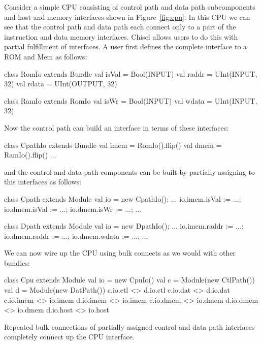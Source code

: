 \documentclass[twocolumn,10pt]{article}
\begin{document}
Consider a simple CPU consisting of control path and data path subcomponents and host and memory interfaces shown in Figure~\ref{fig:cpu}.
In this CPU we can see that the control path and data path each connect only to a part of the instruction and data memory interfaces. 
Chisel allows users to do this with partial fulfillment of interfaces.
A user first defines the complete interface to a ROM and Mem as follows:

\begin{scala}
class RomIo extends Bundle {
  val isVal = Bool(INPUT)
  val raddr = UInt(INPUT, 32)
  val rdata = UInt(OUTPUT, 32)
}

class RamIo extends RomIo {
  val isWr  = Bool(INPUT)
  val wdata = UInt(INPUT, 32)
}
\end{scala}

\noindent
Now the control path can build an interface in terms of these interfaces:

\begin{scala}
class CpathIo extends Bundle {
  val imem = RomIo().flip()
  val dmem = RamIo().flip()
  ...
}
\end{scala}

\noindent
and the control and data path components can be built by partially assigning to
this interfaces as follows:

\begin{scala}
class Cpath extends Module {
  val io = new CpathIo();
  ...
  io.imem.isVal := ...;
  io.dmem.isVal := ...;
  io.dmem.isWr  := ...;
  ...
}

class Dpath extends Module {
  val io = new DpathIo();
  ...
  io.imem.raddr := ...;
  io.dmem.raddr := ...;
  io.dmem.wdata := ...;
  ...
}
\end{scala}

\noindent
We can now wire up the CPU using bulk connects as we would with other bundles:

\begin{scala}
class Cpu extends Module {
  val io = new CpuIo()
  val c  = Module(new CtlPath())
  val d  = Module(new DatPath())
  c.io.ctl  <> d.io.ctl
  c.io.dat  <> d.io.dat
  c.io.imem <> io.imem
  d.io.imem <> io.imem
  c.io.dmem <> io.dmem
  d.io.dmem <> io.dmem
  d.io.host <> io.host
}
\end{scala}

\noindent
Repeated bulk connections of partially assigned control and data path interfaces
completely connect up the CPU interface.
\end{document}
